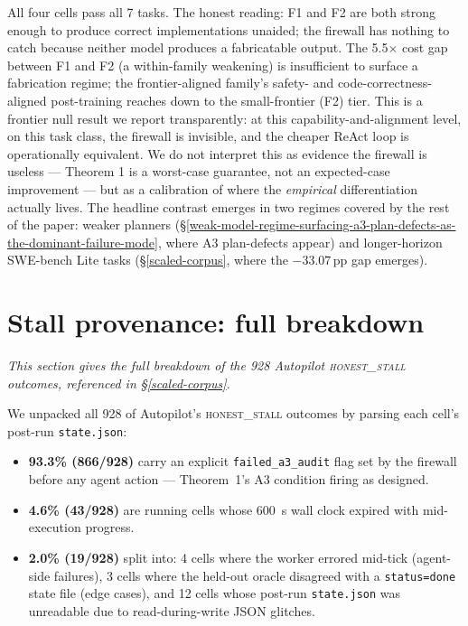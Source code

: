 All four cells pass all 7 tasks. The honest reading: F1 and F2 are both strong enough to produce
correct implementations unaided; the firewall has nothing to catch because neither model produces a
fabricatable output. The 5.5$\times$ cost gap between F1 and F2 (a within-family weakening) is
insufficient to surface a fabrication regime; the frontier-aligned family's safety- and
code-correctness-aligned post-training reaches down to the small-frontier (F2) tier. This is a
frontier null result we report transparently: at this capability-and-alignment level, on this task
class, the firewall is invisible, and the cheaper ReAct loop is operationally equivalent. We do not
interpret this as evidence the firewall is useless --- Theorem 1 is a worst-case guarantee, not an
expected-case improvement --- but as a calibration of where the \emph{empirical} differentiation
actually lives. The headline contrast emerges in two regimes covered by the rest of the paper: weaker
planners (\S\ref{weak-model-regime-surfacing-a3-plan-defects-as-the-dominant-failure-mode}, where
A3 plan-defects appear) and longer-horizon SWE-bench Lite tasks (\S\ref{scaled-corpus}, where the
$-33.07$\,pp gap emerges).

\section{Stall provenance: full breakdown}\label{app:stall-provenance}

\textit{This section gives the full breakdown of the 928 Autopilot \textsc{honest\_stall} outcomes,
referenced in \S\ref{scaled-corpus}.}

We unpacked all 928 of Autopilot's \textsc{honest\_stall} outcomes by parsing each cell's post-run
\texttt{state.json}:

\begin{itemize}
\item \textbf{93.3\% (866/928)} carry an explicit \texttt{failed\_a3\_audit} flag set by the
  firewall before any agent action --- Theorem~1's A3 condition firing as designed.
\item \textbf{4.6\% (43/928)} are running cells whose 600~s wall clock expired with mid-execution
  progress.
\item \textbf{2.0\% (19/928)} split into: 4 cells where the worker errored mid-tick (agent-side
  failures), 3 cells where the held-out oracle disagreed with a \texttt{status=done} state file
  (edge cases), and 12 cells whose post-run \texttt{state.json} was unreadable due to
  read-during-write JSON glitches.
\end{itemize}

